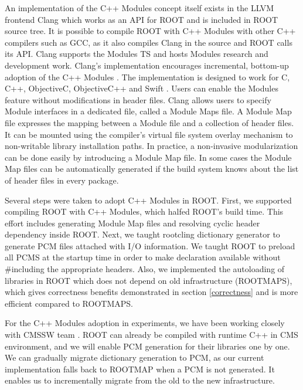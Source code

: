 \documentclass{webofc}
\begin{document}
An implementation of the C++ Modules concept itself exists in the LLVM frontend Clang \cite{clang-Modules-doc} which works as an API for ROOT and is included in ROOT source tree. It is possible to compile ROOT with C++ Modules with other C++ compilers such as GCC, as it also compiles Clang in the source and ROOT calls its API. Clang supports the Modules TS and hosts Modules research and development work. Clang's implementation encourages incremental, bottom-up adoption of the C++ Modules \cite{Smith-cppcon}. The implementation is designed to work for C, C++, ObjectiveC, ObjectiveC++ and Swift \cite{Moduralize-doc}. Users can enable the Modules feature without modifications in header files. Clang allows users to specify Module interfaces in a dedicated file, called a Module Maps file. A Module Map file expresses the mapping between a Module file and a collection of header files. It can be mounted using the compiler’s virtual file system overlay mechanism to non-writable library installation paths. In practice, a non-invasive modularization can be done easily by introducing a Module Map file. In some cases the Module Map files can be automatically generated if the build system knows about the list of header files in every package.

Several steps were taken to adopt C++ Modules in ROOT. First, we supported compiling ROOT with C++ Modules, which halfed ROOT's build time. This effort includes generating Module Map files and resolving cyclic header dependency inside ROOT. Next, we taught rootcling dictionary generator to generate PCM files attached with I/O information. We taught ROOT to preload all PCMS at the startup time in order to make declaration available without \#including the appropriate headers. Also, we implemented the autoloading of libraries in ROOT which does not depend on old infrastructure (ROOTMAPS), which gives correctness benefits demonstrated in section \ref{correctness} and is more efficient compared to ROOTMAPS.


For the C++ Modules adoption in experiments, we have been working closely with CMSSW team \cite{cms}. ROOT can already be compiled with runtime C++ in CMS environment, and we will enable PCM generation for their libraries one by one. We can gradually migrate dictionary generation to PCM, as our current implementation falls back to ROOTMAP when a PCM is not generated. It enables us to incrementally migrate from the old to the new infrastructure.
\end{document}
